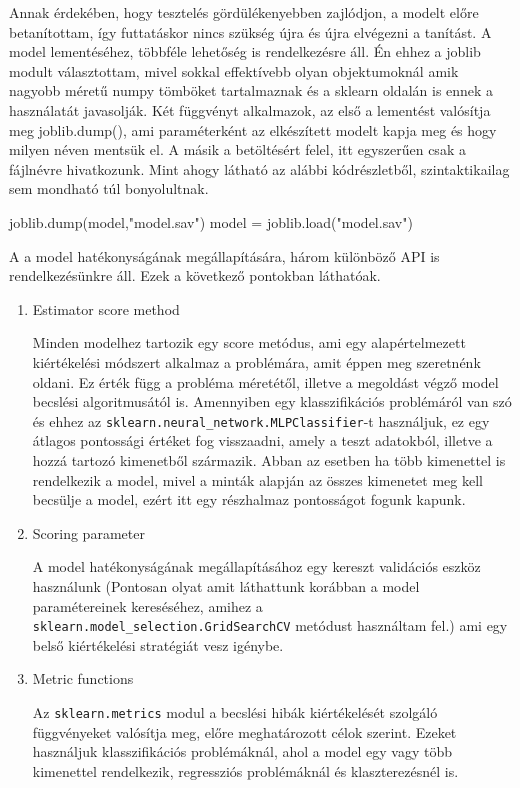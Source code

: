 Annak érdekében, hogy tesztelés gördülékenyebben zajlódjon, a modelt előre betanítottam, így futtatáskor nincs szükség újra és újra elvégezni a tanítást.
A model lementéséhez, többféle lehetőség is rendelkezésre áll. Én ehhez a joblib modult választottam, mivel sokkal effektívebb olyan objektumoknál amik nagyobb méretű numpy tömböket tartalmaznak és a sklearn oldalán is ennek a használatát javasolják.
Két függvényt alkalmazok, az első a lementést valósítja meg joblib.dump(), ami paraméterként az elkészített modelt kapja meg és hogy milyen néven mentsük el.
A másik a betöltésért felel, itt egyszerűen csak a fájlnévre hivatkozunk.
Mint ahogy látható az alábbi kódrészletből, szintaktikailag sem mondható túl bonyolultnak.

\begin{python}
joblib.dump(model,"model.sav") 
model = joblib.load("model.sav") 
\end{python}

A a model hatékonyságának megállapítására, három különböző API is rendelkezésünkre áll.
Ezek a következő pontokban láthatóak.

\begin{enumerate}
\item Estimator score method

Minden modelhez tartozik egy score metódus, ami egy alapértelmezett kiértékelési módszert alkalmaz a problémára, amit éppen meg szeretnénk oldani. 
Ez érték függ a probléma méretétől, illetve a megoldást végző model becslési algoritmusától is.
Amennyiben egy klasszifikációs problémáról van szó és ehhez az \texttt{sklearn.neural\_network.MLPClassifier}-t használjuk, ez egy átlagos pontossági értéket fog visszaadni, amely a teszt adatokból, illetve a hozzá tartozó kimenetből származik. Abban az esetben ha több kimenettel is rendelkezik a model, mivel a minták alapján az összes kimenetet meg kell becsülje a model, ezért itt egy részhalmaz pontosságot fogunk kapunk.

\item Scoring parameter

A model hatékonyságának megállapításához egy kereszt validációs eszköz használunk (Pontosan olyat amit láthattunk korábban a model paramétereinek kereséséhez, amihez a \texttt{sklearn.model\_selection.GridSearchCV} metódust használtam fel.) ami egy belső kiértékelési stratégiát vesz igénybe.

\item Metric functions

Az \texttt{sklearn.metrics} modul a becslési hibák kiértékelését szolgáló függvényeket valósítja meg, előre meghatározott célok szerint.
Ezeket használjuk klasszifikációs problémáknál, ahol a model egy vagy több kimenettel rendelkezik, regressziós problémáknál és klaszterezésnél is.
\end{enumerate}

